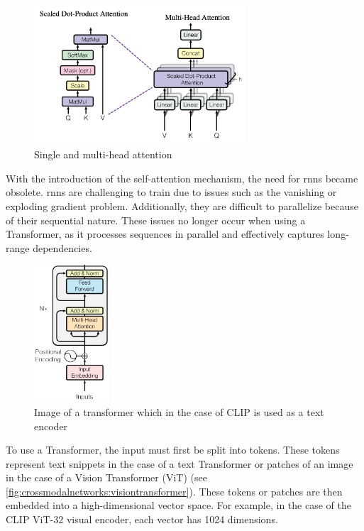     \begin{figure}[]
        \centering
        \includegraphics[width=0.7\textwidth]{Images/crossmodalnetworks/attention.png}
        \caption{Single and multi-head attention\cite{attentionisallyouneed}}
        \label{fig:crossmodalnetworks:attention}
    \end{figure}

    With the introduction of the self-attention mechanism, the need for \acrshort{rnn}s became obsolete. 
    \acrshort{rnn}s are challenging to train due to issues such as the vanishing or exploding gradient problem. 
    Additionally, they are difficult to parallelize because of their sequential nature. 
    These issues no longer occur when using a Transformer, as it processes sequences in parallel and effectively captures long-range dependencies.


    \begin{figure}[]
        \centering
        \includegraphics[width=0.25\textwidth]{Images/crossmodalnetworks/The-Transformer-encoder-structure.png}
        \caption{Image of a transformer which in the case of CLIP is used as a text encoder\cite{attentionisallyouneed}}
        \label{fig:crossmodalnetworks:transformer}
    \end{figure}

    To use a Transformer, the input must first be split into tokens. 
    These tokens represent text snippets in the case of a text Transformer or patches of an image in the case of a Vision Transformer (ViT) (see \cref{fig:crossmodalnetworks:visiontransformer}). 
    These tokens or patches are then embedded into a high-dimensional vector space. 
    For example, in the case of the CLIP ViT-32 visual encoder, each vector has 1024 dimensions.


